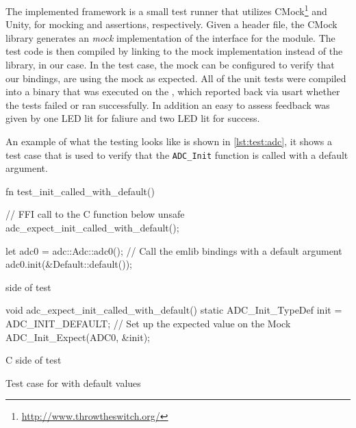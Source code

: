 The implemented framework is a small test runner that utilizes CMock\footnote{\url{http://www.throwtheswitch.org/}\label{foot:throw}} and Unity, for mocking and assertions, respectively.
Given a {\C} header file, the CMock library generates an \emph{mock} implementation of the interface for the module.
The test code is then compiled by linking to the mock implementation instead of the library, {\emlib} in our case.
In the test case, the mock can be configured to verify that our bindings, are using the mock as expected.
All of the unit tests were compiled into a binary that was executed on the {\gecko}, which reported back via \gls{usart} whether the tests failed or ran successfully.
In addition an easy to assess feedback was given by one LED lit for faliure and two LED lit for success.

An example of what the testing looks like is shown in \autoref{lst:test:adc}, it shows a test case that is used to verify that the \texttt{ADC\_Init} function is called with a default argument.

\begin{listing}[H]
  \centering
  \begin{minipage}{\textwidth}
  \begin{listing}
    \begin{rustcode}
fn test_init_called_with_default() {
  // FFI call to the C function below
  unsafe { adc_expect_init_called_with_default(); }

  let adc0 = adc::Adc::adc0();
  // Call the emlib bindings with a default argument
  adc0.init(&Default::default());
}
    \end{rustcode}
    \caption{{\rust} side of  test}
    \label{lst:test:adc:rust}
  \end{listing}
  \end{minipage}

  \begin{minipage}{\textwidth}
  \begin{listing}
    \begin{ccode}
void adc_expect_init_called_with_default() {
  static ADC_Init_TypeDef init = ADC_INIT_DEFAULT;
  // Set up the expected value on the Mock
  ADC_Init_Expect(ADC0, &init);
}
    \end{ccode}
    \caption{C side of  test}
    \label{lst:test:adc:c}
  \end{listing}
  \end{minipage}

  \caption{Test case for  with default values}
  \label{lst:test:adc}
\end{listing}

